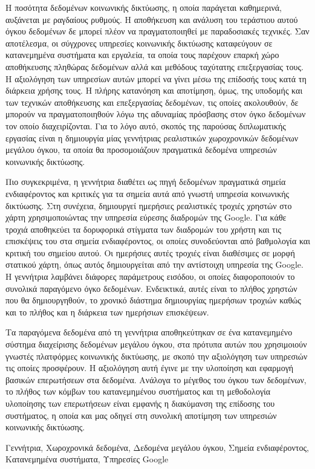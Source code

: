 
\begin{abstractgr}%

Η ποσότητα δεδομένων κοινωνικής δικτύωσης, η οποία παράγεται καθημερινά, αυξάνεται με ραγδαίους ρυθμούς. Η αποθήκευση και ανάλυση του τεράστιου αυτού όγκου δεδομένων 
δε μπορεί πλέον να πραγματοποιηθεί με παραδοσιακές τεχνικές. Σαν αποτέλεσμα, οι σύγχρονες υπηρεσίες κοινωνικής δικτύωσης καταφεύγουν σε κατανεμημένα συστήματα και εργαλεία, 
τα οποία τους παρέχουν επαρκή χώρο αποθήκευσης πληθώρας δεδομένων αλλά και μεθόδους ταχύτατης \linebreak επεξεργασίας τους. Η αξιολόγηση των υπηρεσίων αυτών μπορεί να γίνει 
μέσω της επίδοσής τους κατά τη διάρκεια χρήσης τους. Η πλήρης κατανόηση και αποτίμηση, όμως, της υποδομής και των τεχνικών αποθήκευσης και επεξεργασίας δεδομένων, τις 
οποίες ακολουθούν, δε μπορούν να πραγματοποιηθούν λόγω της αδυναμίας πρόσβασης στον όγκο δεδομένων τον οποίο διαχειρίζονται. Για το λόγο αυτό, σκοπός της 
παρούσας διπλωματικής εργασίας είναι η δημιουργία μίας γεννήτριας ρεαλιστικών χωροχρονικών δεδομένων μεγάλου όγκου, τα οποία θα προσομοιάζουν πραγματικά δεδομένα 
υπηρεσιών κοινωνικής δικτύωσης. 

Πιο συγκεκριμένα, η γεννήτρια διαθέτει ως πηγή δεδομένων πραγματικά σημεία ενδιαφέροντος και κριτικές για τα σημεία αυτά από γνωστή υπηρεσία κοινωνικής δικτύωσης. 
Στη συνέχεια, δημιουργεί ημερήσιες ρεαλιστικές τροχιές χρηστών στο χάρτη χρησιμοποιώντας την υπηρεσία εύρεσης διαδρομών της Google. Για κάθε τροχιά αποθηκεύει 
τα δορυφορικά στίγματα των \linebreak διαδρομών του χρήστη και τις επισκέψεις του στα σημεία ενδιαφέροντος, οι οποίες συνοδεύονται από βαθμολογία και κριτική του σημείου αυτού. 
Οι ημερήσιες αυτές τροχιές είναι διαθέσιμες σε μορφή στατικού χάρτη, όπως αυτός δημιουργείται από την αντίστοιχη υπηρεσία της Google. Η γεννήτρια λαμβάνει διάφορες 
παράμετρους εισόδου, οι οποίες διαφοροποιούν το συνολικά παραγόμενο όγκο δεδομένων. Ενδεικτικά, αυτές είναι το πλήθος χρηστών που θα δημιουργηθούν, το 
χρονικό διάστημα δημιουργίας ημερήσιων τροχιών καθώς και το πλήθος και η διάρκεια των ημερήσιων επισκέψεων. 

Τα παραγόμενα δεδομένα από τη γεννήτρια αποθηκεύτηκαν σε ένα κατανεμημένο σύστημα διαχείρισης δεδομένων μεγάλου όγκου, στα πρότυπα αυτών που χρησιμοιούν γνωστές 
πλατφόρμες κοινωνικής δικτύωσης, με σκοπό την αξιολόγηση των υπηρεσιών τις οποίες προσφέρουν. Η αξιολόγηση αυτή έγινε με την υλοποίηση και εφαρμογή 
βασικών επερωτήσεων στα δεδομένα. 
Ανάλογα το μέγεθος του όγκου των δεδομένων, το πλήθος των κόμβων του κατανεμημένου συστήματος και τη μεθοδολογία υλοποίησης των 
επερωτήσεων είναι εμφανής η διακύμανση της επίδοσης του συστήματος, η οποία και μας οδηγεί στη συνολική αποτίμηση των υπηρεσιών κοινωνικής δικτύωσης. 


  \begin{keywordsgr}
  Γεννήτρια, Χωροχρονικά δεδομένα, Δεδομένα μεγάλου όγκου, Σημεία ενδιαφέροντος, \linebreak Κατανεμημένα συστήματα, Υπηρεσίες Google
  \end{keywordsgr}
\end{abstractgr}
